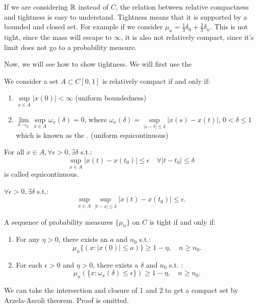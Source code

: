 \documentclass[../main/main.tex]{subfiles}
\begin{document}
\begin{remark}
	If we are considering $\mathbb{R}$ instead of $C$, the relation between relative compactness and tightness is easy to understand. Tightness means that it is supported by a bounded and closed set. For example if we consider $\mu_n = \frac{1}{3}\delta_0 + \frac{2}{3}\delta_n$. This is not tight, since the mass will escape to $\infty$, it is also not relatively compact, since it's limit does not go to a probability measure.
\end{remark}

Now, we will see how to show tightness. We will first use the
\begin{theorem} We consider a set $A \subset C[0,1]$ is relatively compact if and only if:
	\begin{enumerate}
		\item $\sup\limits_{x \in A} |x(0)| < \infty$ (uniform boundedness)
		\item $\lim\limits_{\delta\to_0}\sup\limits_{x \in A} \omega_x(\delta) = 0$, where $\omega_x(\delta) = \sup\limits_{|s - t| \leq \delta} |x(s) - x(t) | $, $0 < \delta \leq 1$ which is known as the . (uniform equicontinuous)
	\end{enumerate}
\end{theorem}
\begin{definition} For all $x \in A, \forall \epsilon > 0 , \exists \delta$ s.t.: \[
		\sup\limits_{x \in A}| x(t) - x(t_0) | \leq \epsilon \quad \forall |t - t_0| \leq \delta
	\]  is called equicontinuous.
\end{definition}
\begin{definition} $\forall \epsilon > 0 , \exists \delta$ s.t.: \[
		\sup\limits_{x \in A}\sup\limits_{|t - s| \leq \delta}| x(t) - x(t_0) | \leq \epsilon.
	\]
\end{definition}
\begin{theorem}
	A sequence of probability measures $\{\mu_n\}$ on $C$ is tight if and only if:
	\begin{enumerate}
		\item For any $\eta > 0$, there exists an $a$ and $n_0$ s.t.: \[
			      \mu_n\{(x : |x(0)| \leq a)\} \geq 1-\eta ,\quad n \geq n_0.
		      \]
		\item For each $\epsilon > 0$ and $\eta > 0$, there exists a $\delta$ and $n_0$ s.t. : \[
			      \mu_n(\{x : \omega_x(\delta) \leq \epsilon\}) \geq 1- \eta, \quad n \geq n_0.
		      \]
	\end{enumerate}
\end{theorem}
We can take the intersection and closure of 1 and 2 to get a compact set by Arzela-Ascoli theorem. Proof is omitted.\\
\end{document}
